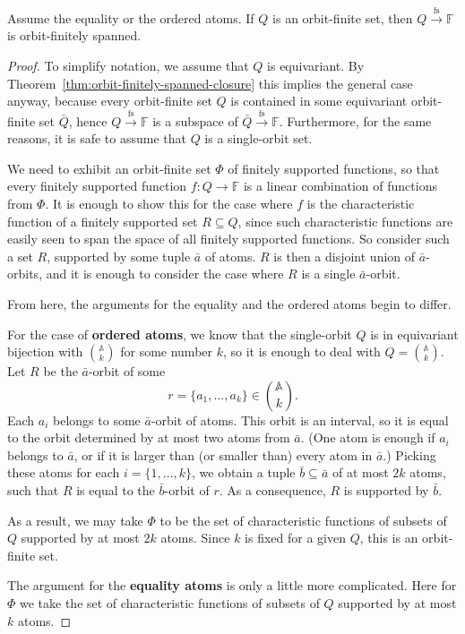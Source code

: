 \documentclass{theoretics}
\newcommand{\atoms}{\mathbb A}
\newcommand{\field}{\mathbb F}
\newcommand{\finsup}{\stackrel{\mathrm{fs}}{\to}}
\newcommand{\forms}[1]{#1 \finsup \field}
\begin{document}
\begin{theorem}\label{thm:forms-orbit-finite} Assume the equality or the ordered atoms. If $Q$ is an orbit-finite set, then  $\forms Q$ is   orbit-finitely spanned.
\end{theorem}
\begin{proof}
To simplify notation, we assume that $Q$ is equivariant. By Theorem~\ref{thm:orbit-finitely-spanned-closure} this implies the general case anyway, because every orbit-finite set $Q$ is contained in some equivariant orbit-finite set $\bar{Q}$, hence $\forms Q$ is a subspace of $\forms {\bar{Q}}$. Furthermore, for the same reasons, it is safe to assume that $Q$ is a single-orbit set.

We need to exhibit an orbit-finite set $\Phi$ of finitely supported functions, so that every finitely supported function $f:Q\to\field$ is a linear combination of functions from $\Phi$. It is enough to show this for the case where $f$ is the characteristic function of a finitely supported set $R\subseteq Q$, since such characteristic functions are easily seen to span the space of all finitely supported functions. So consider such a set $R$, supported by some tuple $\bar a$ of atoms. $R$ is then a disjoint union of $\bar a$-orbits, and it is enough to consider the case where $R$ is a single $\bar a$-orbit.

From here, the arguments for the equality and the ordered atoms begin to differ.

For the case of {\bf ordered atoms}, we know that the single-orbit $Q$ is in equivariant bijection with $\atoms\choose k$ for some number $k$, so it is enough to deal with $Q={\atoms\choose k}$. Let $R$ be the $\bar a$-orbit of some 
\[
	\textstyle r = \{a_1,\ldots,a_k\}\in{\atoms\choose k}.
\]
Each $a_i$ belongs to some $\bar a$-orbit of atoms. This orbit is an interval, so it is equal to the orbit determined by at most two atoms from $\bar a$. (One atom is enough if $a_i$ belongs to $\bar a$, or if it is larger than (or smaller than) every atom in $\bar a$.) Picking these atoms for each $i=\{1,\ldots, k\}$, we obtain a tuple $\bar b\subseteq \bar a$ of at most $2k$ atoms, such that $R$ is equal to the $\bar b$-orbit of $r$. As a consequence, $R$ is supported by $\bar b$.

As a result, we may take $\Phi$ to be the set of characteristic functions of subsets of $Q$ supported by at most $2k$ atoms. Since $k$ is fixed for a given $Q$, this is an orbit-finite set.

The argument for the {\bf equality atoms} is only a little more complicated. Here for $\Phi$ we take the set of characteristic functions of subsets of $Q$ supported by at most $k$ atoms. 


\end{proof}
\end{document}
